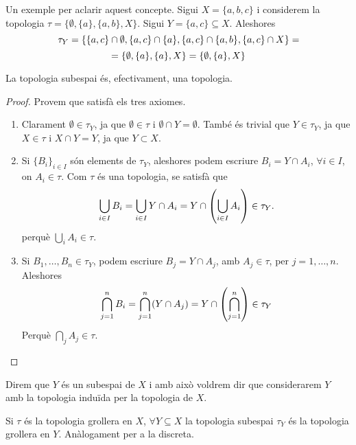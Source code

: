 \documentclass[../main.tex]{subfiles}
\begin{document}
\begin{ej}
Un exemple per aclarir aquest concepte. Sigui $X = \{a,b,c\}$ i considerem la topologia $\tau = \{\emptyset,\{a\},\{a,b\},X\}$. Sigui $Y = \{a,c\}\subseteq X$. Aleshores
\begin{equation}
    \notag
    \tau_Y = \{\{a,c\}\cap\emptyset,\{a,c\}\cap\{a\},\{a,c\}\cap\{a,b\},\{a,c\}\cap X\} =
\end{equation}
\begin{equation}
    \notag
    = \{\emptyset,\{a\},\{a\},X\} = \{\emptyset,\{a\},X\}
\end{equation}
\end{ej}

\begin{prop}
\label{prop:topologiasubespai} La topologia subespai és, efectivament, una topologia.
\end{prop}
\begin{proof}
Provem que satisfà els tres axiomes.
\begin{enumerate}[(1)]
    \item Clarament $\emptyset\in \tau_Y$, ja que $\emptyset \in\tau$ i $\emptyset\cap Y = \emptyset$. També és trivial que $Y\in\tau_Y$, ja que $X\in\tau$ i $X\cap Y = Y$, ja que $Y\subset X$.
    \item Si $\{B_i\}_{i\in I}$ són elements de $\tau_Y$, aleshores podem escriure $B_i = Y\cap A_i$, $\forall i\in I$, on $A_i\in \tau$. Com $\tau$ és una topologia, se satisfà que 
    \begin{equation}
        \notag
        \bigcup_{i\in I} B_i = \bigcup_{i\in I}Y\cap A_i = Y\cap\left(\bigcup_{i\in I}A_i\right)\in\tau_Y.
    \end{equation}
    perquè $\bigcup_iA_i\in \tau$.
    \item Si $B_1,\ldots,B_n\in \tau_Y$, podem escriure $B_j = Y\cap A_j$, amb $A_j\in\tau$, per $j = 1,\ldots,n$. Aleshores
    \begin{equation}
        \notag
        \bigcap_{j=1}^n B_i = \bigcap_{j=1}^n(Y\cap A_j) = Y\cap\left(\bigcap_{j=1}^n\right)\in \tau_Y
    \end{equation}
    Perquè $\bigcap_j A_j\in\tau$.
\end{enumerate}
\end{proof}

Direm que $Y$ és un subespai de $X$ i amb això voldrem dir que considerarem $Y$ amb la topologia induïda per la topologia de $X$.

\begin{ej}
\label{ej:topologiasubespai2} Si $\tau$ és la topologia grollera en $X$, $\forall Y\subseteq X$ la topologia subespai $\tau_Y$ és la topologia grollera en $Y$. Anàlogament per a la discreta.
\end{ej}
\end{document}
